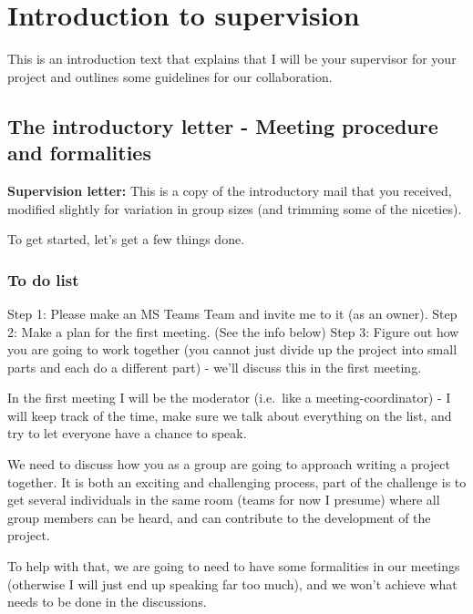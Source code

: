 \documentclass[
]{book}
\begin{document}
\hypertarget{introduction-to-supervision}{%
\chapter{Introduction to supervision}\label{introduction-to-supervision}}

This is an introduction text that explains that I will be your
supervisor for your project and outlines some guidelines for our
collaboration.

\hypertarget{the-introductory-letter---meeting-procedure-and-formalities}{%
\section{The introductory letter - Meeting procedure and formalities}\label{the-introductory-letter---meeting-procedure-and-formalities}}

\textbf{Supervision letter:}
This is a copy of the introductory mail that you received, modified slightly for variation in group sizes (and trimming some of the niceties).

To get started, let's get a few things done.

\hypertarget{to-do-list}{%
\subsection{To do list}\label{to-do-list}}

Step 1: Please make an MS Teams Team and invite me to it (as an owner).
Step 2: Make a plan for the first meeting. (See the info below)
Step 3: Figure out how you are going to work together (you cannot just divide up the project into small parts and each do a different part) - we'll discuss this in the first meeting.

In the first meeting I will be the moderator (i.e.~like a meeting-coordinator) - I will keep track of the time, make sure we talk about everything on the list, and try to let everyone have a chance to speak.

We need to discuss how you as a group are going to approach writing a project together. It is both an exciting and challenging process, part of the challenge is to get several individuals in the same room (teams for now I presume) where all group members can be heard, and can contribute to the development of the project.

To help with that, we are going to need to have some formalities in our meetings (otherwise I will just end up speaking far too much), and we won't achieve what needs to be done in the discussions.
\end{document}
